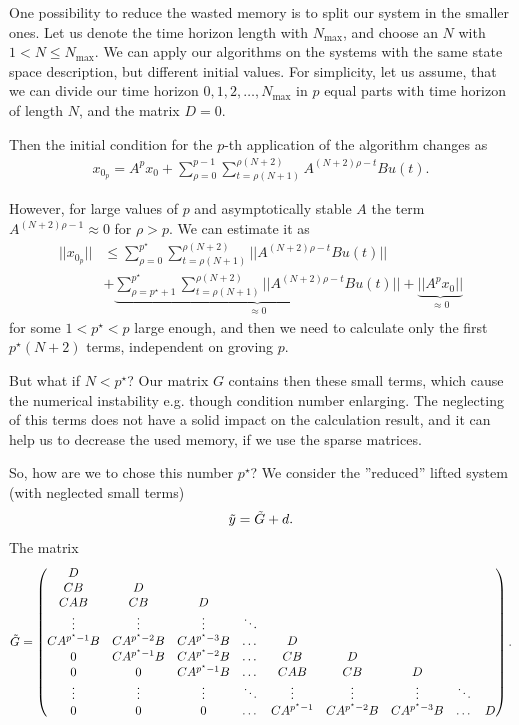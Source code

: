 	One possibility to reduce the wasted memory is to split our system in the smaller ones. Let us denote the time horizon length with $N_{\max}$, and choose an $N$ with $1<N\leq N_{\max}$. 
	We can apply our algorithms on the systems with the same state space description, but different initial values. For simplicity, let us assume, that we can divide our time horizon $0,1,2,\dots, N_{\max}$ in $p$ equal parts with time horizon of length $N$, and the matrix $D = 0$. 
	
	Then the initial condition for the $p$-th application of the algorithm changes as 
	\begin{align}
	x_{0_p}= A^p x_0 + \sum_{\rho = 0}^{p - 1} \sum_{t = \rho (N + 1)}^{\rho (N+2)} A^{(N+2)\rho - t} B u(t). 
	\end{align}
	
	However, for large values of $p$ and asymptotically stable $A$ the term $A^{(N+2)\rho - 1 }\approx 0$ for $\rho > p$.
	We can estimate it as 
	\begin{align}
	||x_{0_p}|| &\leq  \sum_{\rho = 0}^{p^{\star}} \sum_{t = \rho (N + 1)}^{\rho (N+2)} ||A^{(N+2)\rho - t} B u(t)|| \\
	&+
	\underbrace{\sum_{\rho = p^\star+1}^{p^{\star}} \sum_{t = \rho (N + 1)}^{\rho (N+2)} ||A^{(N+2)\rho - t} B u(t)||}_{\approx 0} + \underbrace{||A^p x_0||}_{\approx 0} 
	\end{align}
	for some $1<p^{\star}<p$ large enough, and then we need to calculate only the first $p^\star (N+2)$ terms, independent on groving $p$. 
	
	But what if $N < p^\star$? Our matrix $G$ contains then these small terms, which cause the numerical instability e.g. though condition number enlarging. The neglecting of this terms does not have a solid impact on the calculation result, and it can help us to decrease the used memory, if we use the sparse matrices. 
	
	So, how are we to chose this number $p^\star$? We consider the ''reduced'' lifted system (with neglected small terms)
	\begin{align}
	\tilde{y} = \tilde{G} + d.
	\end{align}
	The matrix 
	\begin{align}
	\tilde{G} = \begin{pmatrix}
	D  \\
	CB & D \\
	C A B & CB & D\\
	\vdots & \vdots & \vdots & \ddots \\
	C A^{p^\star-1} B & C A^{p^\star-2}B & C A^{p^\star-3}B &\dots& D \\
	0           & C A^{p^\star-1} B & C A^{p^\star-2} B & \dots & CB & D\\
	0 & 0 & C A^{p^\star-1} B & \dots & CAB & CB & D \\
	\vdots & \vdots & \vdots & \ddots & \vdots & \vdots & \vdots & \ddots \\
	0 & 0 & 0 & \dots & C A^{p^\star-1}& C A^{p^\star-2}B& CA^{p^\star-3}B &\dots & D
	\end{pmatrix}.
	\end{align}
	

